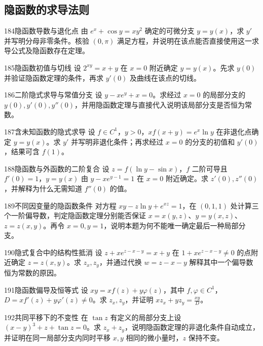 \subsection{隐函数的求导法则}
\begin{exercise}{184}{隐函数导数与退化点}
由 $e^x+\cos y=xy^2$ 确定的可微分支 $y=y(x)$，求 $y'$ 并写明分母非零条件。核验 $(0,\pi)$ 满足方程，并说明在该点能否直接使用这一求导公式及隐函数存在定理。
\end{exercise}
\begin{exercise}{185}{隐函数初值与切线}
设 $2^{xy}=x+y$ 在 $x=0$ 附近确定 $y=y(x)$。先求 $y(0)$ 并验证隐函数定理的条件，再求 $y'(0)$ 及曲线在该点的切线。
\end{exercise}
\begin{exercise}{186}{二阶隐式求导与常值分支}
设 $y-xe^y+x=0$。求经过 $x=0$ 的局部分支的 $y(0),y'(0),y''(0)$，并用隐函数定理与直接代入说明该局部分支是否恒为常数。
\end{exercise}
\begin{exercise}{187}{含未知函数的隐式求导}
设 $f\in C^1$，$y>0$，$xf(x+y)=e^x\ln y$ 在非退化点确定 $y=y(x)$。求 $y'$ 并写明非退化条件；再求经过 $x=0$ 的分支的初值和 $y'(0)$，结果可含 $f(1)$。
\end{exercise}
\begin{exercise}{188}{隐函数与外函数的二阶复合}
设 $z=f(\ln y-\sin x)$，$f$ 二阶可导且 $f'(0)=1$，$y=y(x)$ 由 $y-xe^{y-1}=1$ 在 $x=0$ 附近确定。求 $z'(0),z''(0)$，并解释为什么无需知道 $f''(0)$ 的值。
\end{exercise}
\begin{exercise}{189}{不同因变量的隐函数条件}
对方程 $xy-z\ln y+e^{xz}=1$，在 $(0,1,1)$ 处计算三个一阶偏导数，判定隐函数定理分别能否保证 $x=x(y,z)$、$y=y(x,z)$、$z=z(x,y)$。再令 $x=0,y=1$，说明本题为何不能唯一确定最后一种局部分支。
\end{exercise}
\begin{exercise}{190}{隐式复合中的结构性抵消}
设 $z+xe^{z-x-y}=x+y$ 在 $1+xe^{z-x-y}\ne0$ 的点附近确定 $z=z(x,y)$。求 $z_x,z_y$，并通过代换 $w=z-x-y$ 解释其中一个偏导数恒为常数的原因。
\end{exercise}
\begin{exercise}{191}{隐函数偏导及恒等式}
设 $xy=xf(z)+y\varphi(z)$，其中 $f,\varphi\in C^1$，$D=xf'(z)+y\varphi'(z)\ne0$。求 $z_x,z_y$，并证明 $xz_x+yz_y=\frac{xy}D$。
\end{exercise}
\begin{exercise}{192}{共同平移下的不变性}
在 $\tan z$ 有定义的局部分支上设 $(x-y)^3+z+\tan z=0$。求 $z_x+z_y$，说明隐函数定理的非退化条件自动成立，并证明在同一局部分支内同时平移 $x,y$ 相同的微小量时，$z$ 保持不变。
\end{exercise}
